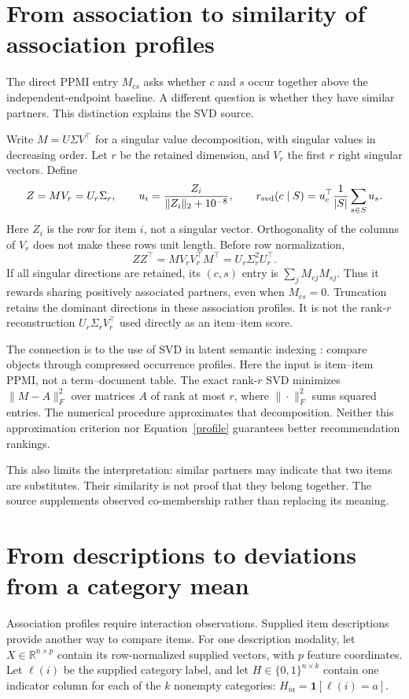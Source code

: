 \documentclass[11pt,a4paper]{article}
\begin{document}
\section{From association to similarity of association profiles}
The direct PPMI entry $M_{cs}$ asks whether $c$ and $s$ occur together above
the independent-endpoint baseline. A different question is whether they have
similar partners. This distinction explains the SVD source.

Write $M=U\Sigma V^\top$ for a singular value decomposition, with singular
values in decreasing order. Let $r$ be the retained dimension, and $V_r$ the
first $r$ right singular vectors. Define
\[
 Z=MV_r=U_r\Sigma_r,\qquad
 u_i=\frac{Z_i}{\|Z_i\|_2+10^{-8}},\qquad
 r_{\rm svd}(c\mid S)=u_c^\top\frac1{|S|}\sum_{s\in S}u_s.
\]
Here $Z_i$ is the row for item $i$, not a singular vector. Orthogonality of the
columns of $V_r$ does not make these rows unit length.
Before row normalization,
\begin{equation}\label{profile}
 ZZ^\top=MV_rV_r^\top M^\top=U_r\Sigma_r^2U_r^\top.
\end{equation}
If all singular directions are retained, its $(c,s)$ entry is
$\sum_j M_{cj}M_{sj}$. Thus it rewards sharing positively associated partners,
even when $M_{cs}=0$. Truncation retains the dominant directions in these
association profiles. It is not the rank-$r$ reconstruction
$U_r\Sigma_rV_r^\top$ used directly as an item--item score.

The connection is to the use of SVD in latent semantic indexing
\cite{lsi}: compare objects through compressed occurrence profiles.
Here the input is item--item PPMI, not a term--document table.
The exact rank-$r$ SVD minimizes $\|M-A\|_F^2$ over matrices $A$ of rank at
most $r$, where $\|\cdot\|_F^2$ sums squared entries. The numerical procedure
approximates that decomposition. Neither this approximation criterion nor
Equation~\eqref{profile} guarantees better recommendation rankings.

This also limits the interpretation: similar partners may indicate that two
items are substitutes. Their similarity is not proof that they belong together.
The source supplements observed co-membership rather than replacing its meaning.

\section{From descriptions to deviations from a category mean}
Association profiles require interaction observations. Supplied item descriptions
provide another way to compare items. For one description modality, let
$X\in\mathbb R^{n\times p}$ contain its row-normalized supplied vectors,
with $p$ feature coordinates. Let $\ell(i)$ be the supplied category label,
and let $H\in\{0,1\}^{n\times k}$ contain one indicator column for each of the
$k$ nonempty categories: $H_{ia}=\mathbf1[\ell(i)=a]$.
\end{document}
